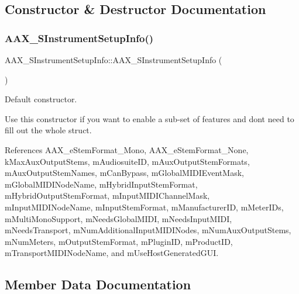 \subsection{Constructor \& Destructor Documentation}
\mbox{\label{a01957_ac5626759986bbe38a6bc9790861c1591}} 
\subsubsection{\texorpdfstring{AAX\_SInstrumentSetupInfo()}{AAX\_SInstrumentSetupInfo()}}
{\footnotesize\ttfamily A\+A\+X\+\_\+\+S\+Instrument\+Setup\+Info\+::\+A\+A\+X\+\_\+\+S\+Instrument\+Setup\+Info (\begin{DoxyParamCaption}{ }\end{DoxyParamCaption})\hspace{0.3cm}{\ttfamily [inline]}}



Default constructor. 

Use this constructor if you want to enable a sub-\/set of features and don\textquotesingle{}t need to fill out the whole struct. 

References A\+A\+X\+\_\+e\+Stem\+Format\+\_\+\+Mono, A\+A\+X\+\_\+e\+Stem\+Format\+\_\+\+None, k\+Max\+Aux\+Output\+Stems, m\+Audiosuite\+ID, m\+Aux\+Output\+Stem\+Formats, m\+Aux\+Output\+Stem\+Names, m\+Can\+Bypass, m\+Global\+M\+I\+D\+I\+Event\+Mask, m\+Global\+M\+I\+D\+I\+Node\+Name, m\+Hybrid\+Input\+Stem\+Format, m\+Hybrid\+Output\+Stem\+Format, m\+Input\+M\+I\+D\+I\+Channel\+Mask, m\+Input\+M\+I\+D\+I\+Node\+Name, m\+Input\+Stem\+Format, m\+Manufacturer\+ID, m\+Meter\+I\+Ds, m\+Multi\+Mono\+Support, m\+Needs\+Global\+M\+I\+DI, m\+Needs\+Input\+M\+I\+DI, m\+Needs\+Transport, m\+Num\+Additional\+Input\+M\+I\+D\+I\+Nodes, m\+Num\+Aux\+Output\+Stems, m\+Num\+Meters, m\+Output\+Stem\+Format, m\+Plugin\+ID, m\+Product\+ID, m\+Transport\+M\+I\+D\+I\+Node\+Name, and m\+Use\+Host\+Generated\+G\+UI.



\subsection{Member Data Documentation}
\mbox{\label{a01957_ae2d6f984fa92233e27828994a1e7ef79}} 
